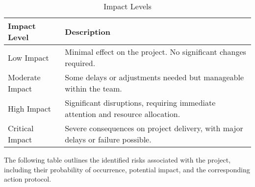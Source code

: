 \documentclass{scrreprt}
\begin{document}
\begin{table}[h!]
	\centering \small
	\renewcommand{\arraystretch}{1.5} %
	\begin{tabular}{|p{5cm}|p{10cm}|} %
		\hline
		\textbf{Impact Level} & \textbf{Description} \\ \hline
		Low Impact & Minimal effect on the project. No significant changes required. \\ \hline
		Moderate Impact & Some delays or adjustments needed but manageable within the team. \\ \hline
		High Impact & Significant disruptions, requiring immediate attention and resource allocation. \\ \hline
		Critical Impact & Severe consequences on project delivery, with major delays or failure possible. \\ \hline
	\end{tabular}
	\caption{Impact Levels}
\end{table} \FloatBarrier
The following table outlines the identified risks associated with the project, including their probability of occurrence, potential impact, and the corresponding action protocol.
\end{document}
